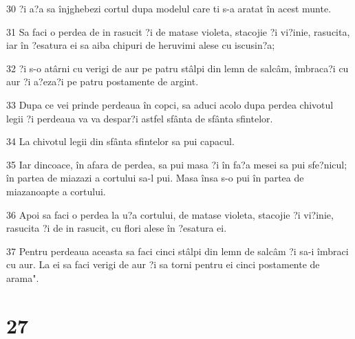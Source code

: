 \par 30 ?i a?a sa înjghebezi cortul dupa modelul care ti s-a aratat în acest munte.
\par 31 Sa faci o perdea de in rasucit ?i de matase violeta, stacojie ?i vi?inie, rasucita, iar în ?esatura ei sa aiba chipuri de heruvimi alese cu iscusin?a;
\par 32 ?i s-o atârni cu verigi de aur pe patru stâlpi din lemn de salcâm, îmbraca?i cu aur ?i a?eza?i pe patru postamente de argint.
\par 33 Dupa ce vei prinde perdeaua în copci, sa aduci acolo dupa perdea chivotul legii ?i perdeaua va va despar?i astfel sfânta de sfânta sfintelor.
\par 34 La chivotul legii din sfânta sfintelor sa pui capacul.
\par 35 Iar dincoace, în afara de perdea, sa pui masa ?i în fa?a mesei sa pui sfe?nicul; în partea de miazazi a cortului sa-l pui. Masa însa s-o pui în partea de miazanoapte a cortului.
\par 36 Apoi sa faci o perdea la u?a cortului, de matase violeta, stacojie ?i vi?inie, rasucita ?i de in rasucit, cu flori alese în ?esatura ei.
\par 37 Pentru perdeaua aceasta sa faci cinci stâlpi din lemn de salcâm ?i sa-i îmbraci cu aur. La ei sa faci verigi de aur ?i sa torni pentru ei cinci postamente de arama".

\chapter{27}

